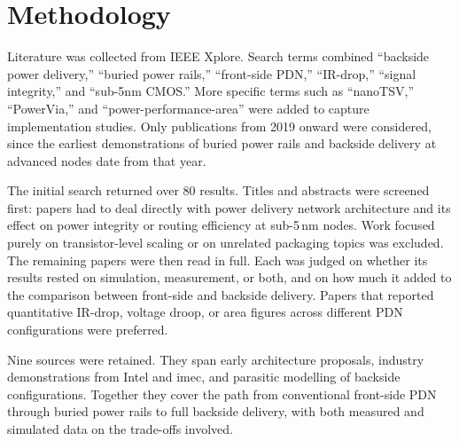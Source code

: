 \section{Methodology}

Literature was collected from IEEE Xplore. Search terms combined ``backside power delivery,'' ``buried power rails,'' ``front-side PDN,'' ``IR-drop,'' ``signal integrity,'' and ``sub-5nm CMOS.'' More specific terms such as ``nanoTSV,'' ``PowerVia,'' and ``power-performance-area'' were added to capture implementation studies. Only publications from 2019 onward were considered, since the earliest demonstrations of buried power rails and backside delivery at advanced nodes date from that year.

The initial search returned over 80 results. Titles and abstracts were screened first: papers had to deal directly with power delivery network architecture and its effect on power integrity or routing efficiency at sub-5\,nm nodes. Work focused purely on transistor-level scaling or on unrelated packaging topics was excluded. The remaining papers were then read in full. Each was judged on whether its results rested on simulation, measurement, or both, and on how much it added to the comparison between front-side and backside delivery. Papers that reported quantitative IR-drop, voltage droop, or area figures across different PDN configurations were preferred.

Nine sources were retained. They span early architecture proposals, industry demonstrations from Intel and imec, and parasitic modelling of backside configurations. Together they cover the path from conventional front-side PDN through buried power rails to full backside delivery, with both measured and simulated data on the trade-offs involved.
